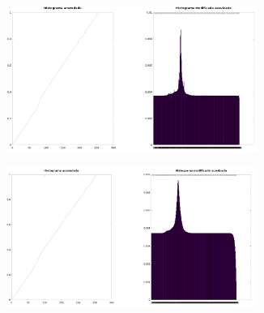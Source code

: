 \documentclass{article}
\begin{document}
\begin{figure}[H]
    \begin{subfigure}{0.5\textwidth}
        \includegraphics[width=0.9\textwidth]{hpuertita20-1.png} 
    \end{subfigure}\hfill
    \begin{subfigure}{0.5\textwidth}
        \includegraphics[width=0.9\textwidth]{hpuertita20-200.png} 
    \end{subfigure}
\end{figure}
\end{document}
